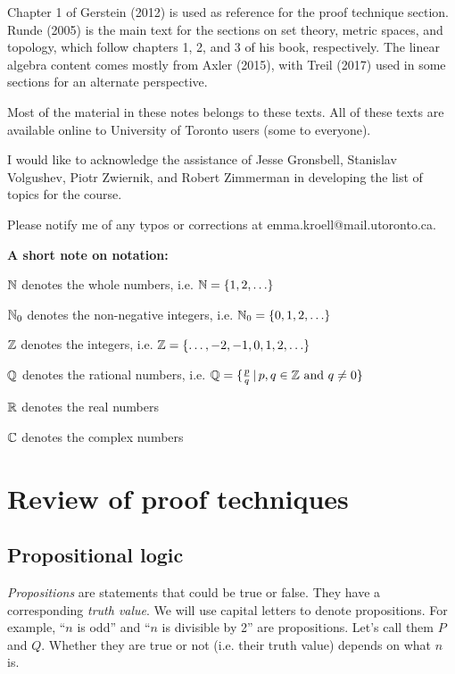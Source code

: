 \documentclass{article}
\begin{document}
Chapter 1 of Gerstein (2012) is used as reference for the proof technique section. Runde (2005) is the main text for the sections on set theory, metric spaces, and topology, which follow chapters 1, 2, and 3 of his book, respectively. The linear algebra content comes mostly from Axler (2015), with Treil (2017) used in some sections for an alternate perspective.

\vspace{1em}

Most of the material in these notes belongs to these texts. All of these texts are available online to University of Toronto users (some to everyone).

\vspace{1em}

I would like to acknowledge the assistance of Jesse Gronsbell, Stanislav Volgushev, Piotr Zwiernik, and Robert Zimmerman in developing the list of topics for the course. 

\vspace{1em}

Please notify me of any typos or corrections at emma.kroell@mail.utoronto.ca.


\newpage
\tableofcontents


\newpage

{\bf A short note on notation: }

\vspace{0.5em}

${\mathbb{N}}$ denotes the whole numbers, i.e. ${\mathbb{N}} = \{1,2,\ldots \}$

${\mathbb{N}}_0$ denotes the non-negative integers, i.e. ${\mathbb{N}}_0 = \{0, 1,2,\ldots \}$

${\mathbb{Z}}$ denotes the integers, i.e. ${\mathbb{Z}} = \{ \ldots, -2,-1,0,1,2,\ldots \}$

${\mathbb{Q}}$ denotes the rational numbers, i.e. ${\mathbb{Q}} = \{ \frac{p}{q} \, | \, p, q \in {\mathbb{Z}} \text{ and } q \neq 0 \}$

${\mathbb{R}}$ denotes the real numbers

${\mathbb{C}}$ denotes the complex numbers



\section{Review of proof techniques}
\subsection{Propositional logic}

\emph{Propositions} are statements that could be true or false. They have a corresponding \emph{truth value}. We will use capital letters to denote propositions. For example, ``$n$ is odd'' and ``$n$ is divisible by 2'' are propositions. Let's call them $P$ and $Q$. Whether they are true or not (i.e. their truth value) depends on what $n$ is. 
\end{document}
